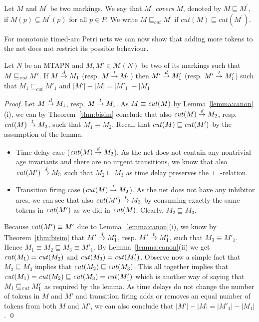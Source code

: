 Let $M$ and $M^\prime$ be two markings. We say that $M^\prime$ \emph{covers} 
$M$, denoted by $M \sqsubseteq M^\prime$, if $M(p) \subseteq M^\prime(p)$ 
for all $p \in P$. We write $M \sqsubseteq_{cut} M^\prime$ 
if $cut(M) \sqsubseteq cut(M^\prime)$.

For monotonic timed-arc Petri nets we can now show that adding more tokens
to the net does not restrict its possible behaviour. 

\begin{lemma}
\label{lem:mono}
Let $N$ be an MTAPN and $M,M' \in \mathcal{M}(N)$
be two of its markings such that $M \sqsubseteq_{\mathit{cut}} M'$. 
If $M \stackrel{d}{\rightarrow} M_1$ (resp. $M \stackrel{t}{\rightarrow} M_1$) then 
$M' \stackrel{d}{\rightarrow} M'_1$ (resp. $M' \stackrel{t}{\rightarrow} M'_1$) such that 
$M_1 \sqsubseteq_{cut} M'_1$ and 
$|M'|-|M|=|M'_1|-|M_1|$.
\end{lemma}
\begin{proof}
Let $M \stackrel{d}{\rightarrow} M_1$, resp. $M \stackrel{t}{\rightarrow} M_1$.
As $M \equiv \mathit{cut}(M)$ by Lemma~\ref{lemma:canon}(i),
we can by Theorem~\ref{thm:bisim} conclude that also $\mathit{cut}(M) \stackrel{d}{\rightarrow} M_2$,
resp. $\mathit{cut}(M) \stackrel{t}{\rightarrow} M_2$,
such that $M_1 \equiv M_2$. Recall that $\mathit{cut}(M) \sqsubseteq \mathit{cut}(M')$
by the assumption of the lemma.
\begin{itemize}
\item Time delay case ($\mathit{cut}(M) \stackrel{d}{\rightarrow} M_2$).
As the net does not contain any nontrivial age invariants
and there are no urgent transitions,
we know that also $\mathit{cut}(M') \stackrel{d}{\rightarrow} M_3$ such that
$M_2 \sqsubseteq M_3$ as time delay preserves the $\sqsubseteq$-relation.
\item Transition firing case ($\mathit{cut}(M) \stackrel{t}{\rightarrow} M_2$).
As the net does not have any inhibitor arcs,
we can see that also $\mathit{cut}(M') \stackrel{t}{\rightarrow} M_3$ by consuming
exactly the same tokens in $\mathit{cut}(M')$ as we did in $\mathit{cut}(M)$.
Clearly, $M_2 \sqsubseteq M_3$.
\end{itemize}
Because $\mathit{cut}(M') \equiv M'$ due to Lemma~\ref{lemma:canon}(i),
we know by Theorem~\ref{thm:bisim}
that $M' \stackrel{d}{\rightarrow} M'_1$, resp. $M' \stackrel{t}{\rightarrow} M'_1$, such that $M_3 \equiv M'_1$.
Hence $M_1 \equiv M_2 \sqsubseteq M_3 \equiv M'_1$.
By Lemma~\ref{lemma:canon}(ii) we get
$\mathit{cut}(M_1)=\mathit{cut}(M_2)$ and $\mathit{cut}(M_3)=\mathit{cut}(M'_1)$.
Observe now a simple fact that $M_2 \sqsubseteq M_3$ implies that
$\mathit{cut}(M_2) \sqsubseteq \mathit{cut}(M_3)$.
This all together implies that $\mathit{cut}(M_1)=\mathit{cut}(M_2) \sqsubseteq
\mathit{cut}(M_3) = \mathit{cut}(M'_1)$ which is another way of saying that
$M_1 \sqsubseteq_{\mathit{cut}} M'_1$ as required by the lemma.
As time delays do not change the number of
tokens in $M$ and $M'$ and transition firing adds or removes an
equal number of tokens from both $M$ and $M'$,
we can also conclude that $|M'|-|M|=|M'_1|-|M_1|$.
\qed
\end{proof}



